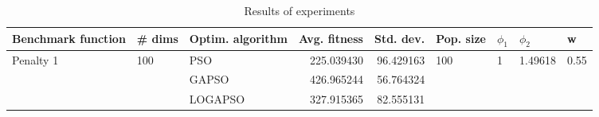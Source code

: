 \begin{table}
\centering
\caption{Results of experiments}
\begin{tabular}{lllrrllll}
\toprule
        Benchmark function &              \# dims & Optim. algorithm &  Avg. fitness &  Std. dev. &            Pop. size &         $\phi_{1}$ &               $\phi_{2}$ &                     w \\
\midrule
\multirow{3}{*}{Penalty 1} & \multirow{3}{*}{100} &              PSO &    225.039430 &  96.429163 & \multirow{3}{*}{100} & \multirow{3}{*}{1} & \multirow{3}{*}{1.49618} & \multirow{3}{*}{0.55} \\
                           &                      &            GAPSO &    426.965244 &  56.764324 &                      &                    &                          &                       \\
                           &                      &          LOGAPSO &    327.915365 &  82.555131 &                      &                    &                          &                       \\
\bottomrule
\end{tabular}
\end{table}

